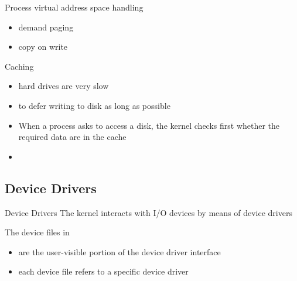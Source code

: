 \begin{frame}
  \begin{exampleblock}{Process virtual address space handling}
    \begin{itemize}
    \item demand paging
    \item copy on write
    \end{itemize}
  \end{exampleblock}
\end{frame}

\begin{frame}
  \begin{exampleblock}{Caching}
    \begin{itemize}
    \item hard drives are very slow
    \item to defer writing to disk as long as possible
    \item When a process asks to access a disk, the kernel checks first whether the
      required data are in the cache
    \item {}
    \end{itemize}
  \end{exampleblock}
\end{frame}

\subsection{Device Drivers}
\label{sec:device-drivers}

\begin{frame}{Device Drivers}
  The kernel interacts with I/O devices by means of device drivers
  \begin{exampleblock}{The device files in }
    \begin{itemize}
    \item are the user-visible portion of the device driver interface
    \item each device file refers to a specific device driver
    \end{itemize}
  \end{exampleblock}
\end{frame}



